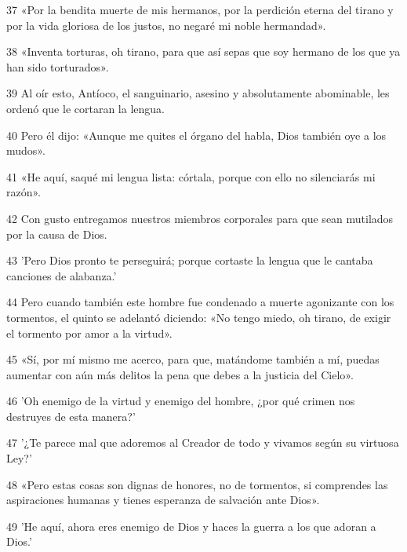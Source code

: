 \par 37 «Por la bendita muerte de mis hermanos, por la perdición eterna del tirano y por la vida gloriosa de los justos, no negaré mi noble hermandad».

\par 38 «Inventa torturas, oh tirano, para que así sepas que soy hermano de los que ya han sido torturados».

\par 39 Al oír esto, Antíoco, el sanguinario, asesino y absolutamente abominable, les ordenó que le cortaran la lengua.

\par 40 Pero él dijo: «Aunque me quites el órgano del habla, Dios también oye a los mudos».

\par 41 «He aquí, saqué mi lengua lista: córtala, porque con ello no silenciarás mi razón».

\par 42 Con gusto entregamos nuestros miembros corporales para que sean mutilados por la causa de Dios.

\par 43 'Pero Dios pronto te perseguirá; porque cortaste la lengua que le cantaba canciones de alabanza.'

\par 44 Pero cuando también este hombre fue condenado a muerte agonizante con los tormentos, el quinto se adelantó diciendo: «No tengo miedo, oh tirano, de exigir el tormento por amor a la virtud».

\par 45 «Sí, por mí mismo me acerco, para que, matándome también a mí, puedas aumentar con aún más delitos la pena que debes a la justicia del Cielo».

\par 46 'Oh enemigo de la virtud y enemigo del hombre, ¿por qué crimen nos destruyes de esta manera?'

\par 47 '¿Te parece mal que adoremos al Creador de todo y vivamos según su virtuosa Ley?'

\par 48 «Pero estas cosas son dignas de honores, no de tormentos, si comprendes las aspiraciones humanas y tienes esperanza de salvación ante Dios».

\par 49 'He aquí, ahora eres enemigo de Dios y haces la guerra a los que adoran a Dios.'

